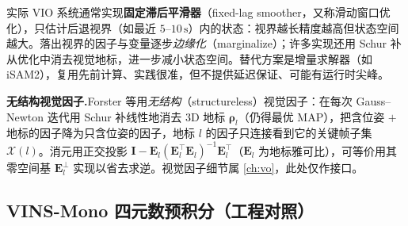 实际 VIO 系统通常实现\textbf{固定滞后平滑器}（fixed-lag smoother，又称滑动窗口优化），只估计后退视界（如最近 $5$--$10\,\mathrm s$）内的状态：视界越长精度越高但状态空间越大。落出视界的因子与变量逐步\emph{边缘化}（marginalize）；许多实现还用 Schur 补从优化中消去视觉地标，进一步减小状态空间\cite{forster2017preintegration}。替代方案是增量求解器（如 iSAM2），复用先前计算、实践很准，但不提供延迟保证、可能有运行时尖峰。

\begin{note}
\textbf{无结构视觉因子.}\;Forster 等用\emph{无结构}（structureless）视觉因子：在每次 Gauss--Newton 迭代用 Schur 补线性地消去 3D 地标 $\boldsymbol\rho_l$（仍得最优 MAP），把含位姿 $+$ 地标的因子降为只含位姿的因子，地标 $l$ 的因子只连接看到它的关键帧子集 $\mathcal X(l)$。消元用正交投影 $\mathbf I-\mathbf E_l(\mathbf E_l^\top\mathbf E_l)^{-1}\mathbf E_l^\top$（$\mathbf E_l$ 为地标雅可比），可等价用其零空间基 $\mathbf E_l^\perp$ 实现以省去求逆\cite{forster2017preintegration}。视觉因子细节属 \cref{ch:vo}，此处仅作接口。
\end{note}

\subsection{VINS-Mono 四元数预积分（工程对照）}
\label{subsec:vins-quat}

